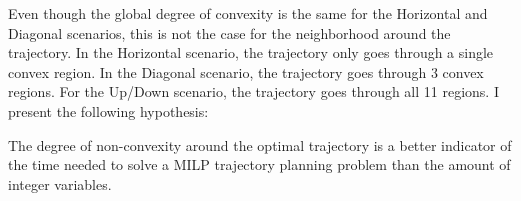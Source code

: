 Even though the global degree of convexity is the same for the Horizontal and Diagonal scenarios, this is not the case for the neighborhood around the trajectory. In the Horizontal scenario, the trajectory only goes through a single convex region. In the Diagonal scenario, the trajectory goes through 3 convex regions. For the Up/Down scenario, the trajectory goes through all 11 regions. I present the following hypothesis:
\begin{hyp}
The degree of non-convexity around the optimal trajectory is a better indicator of the time needed to solve a MILP trajectory planning problem than the amount of integer variables.
\label{hyp:nonconvex}
\end{hyp}

